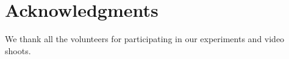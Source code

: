\documentclass{sigchi}
\begin{document}
\section{Acknowledgments}
We thank all the volunteers for participating in our experiments and video shoots.


\end{document}
